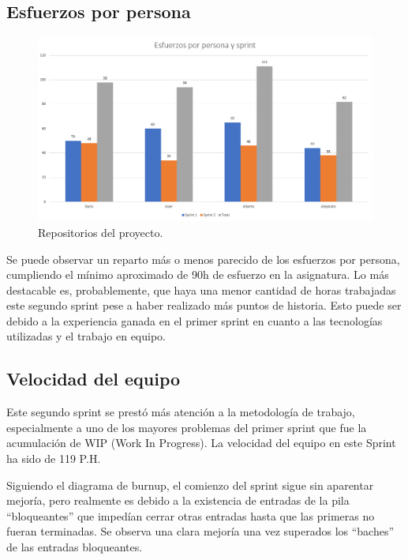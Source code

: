 \documentclass[11pt,a4paper]{report}
\begin{document}
\subsection{Esfuerzos por persona}
\begin{figure}[H]
	\centering
	\includegraphics[width=1\textwidth]{graficos/esfuerzos.png}
	\caption{Repositorios del proyecto.}
	\label{fig: repos}
\end{figure}
Se puede observar un reparto más o menos parecido de los esfuerzos por persona, cumpliendo el mínimo aproximado de 90h de esfuerzo en la asignatura. Lo más destacable es, probablemente, que haya una menor cantidad de horas trabajadas este segundo sprint pese a haber realizado más puntos de historia. Esto puede ser debido a la experiencia ganada en el primer sprint en cuanto a las tecnologías utilizadas y el trabajo en equipo.

\subsection{Velocidad del equipo}
Este segundo sprint se prestó más atención a la metodología de trabajo, especialmente a uno de los mayores problemas del primer sprint que fue la acumulación de WIP (Work In Progress). La velocidad del equipo en este Sprint ha sido de 119 P.H.

Siguiendo el diagrama de burnup, el comienzo del sprint sigue sin aparentar mejoría, pero realmente es debido a la existencia de entradas de la pila “bloqueantes” que impedían cerrar otras entradas hasta que las primeras no fueran terminadas. Se observa una clara mejoría una vez superados los “baches” de las entradas bloqueantes.
 
\end{document}
